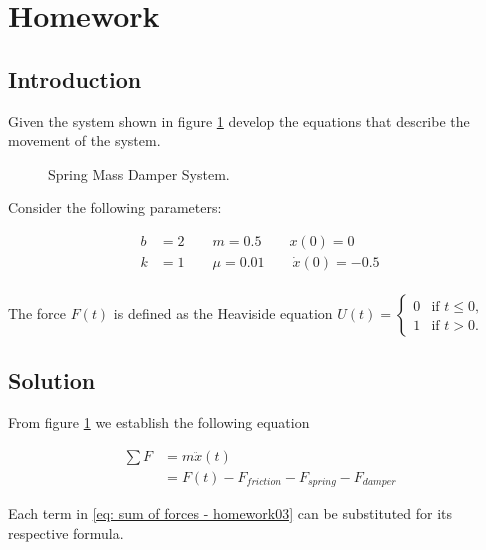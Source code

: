 \section{Homework}

\subsection{Introduction}

Given the system shown in figure 
\ref{fig: hw03_fig01}
develop the equations that describe the movement of the system.

\begin{figure}[ht]
    \centering
    \caption{Spring Mass Damper System.}
    \label{fig: hw03_fig01}
\end{figure}

Consider the following parameters:

\begin{equation*}
 \begin{split}
  b & = 2 \qquad m  = 0.5\qquad  x(0)  = 0\\
  k & = 1 \qquad \mu  = 0.01\qquad \dot{x}(0)  = -0.5 \\  
 \end{split}
\end{equation*}

The force $F(t)$ is defined as the Heaviside equation 
$U(t) = \left\{
\begin{array}{rl}
0 & \text{if } t \leq 0,\\
1 & \text{if } t > 0.
\end{array}\right.$ 


\subsection{Solution}

From figure 
\ref{fig: hw03_fig01}
we establish the following equation

\begin{equation}
\begin{split}
 \sum F & = m \ddot{x}(t)\\
 & = F(t) - F_{friction} - F_{spring} - F_{damper}
 \end{split}
 \label{eq: sum of forces - homework03}
\end{equation}

Each term in \eqref{eq: sum of forces - homework03} can be substituted for its respective formula.

